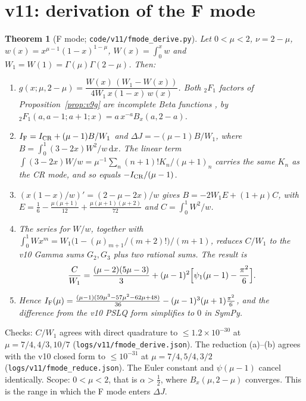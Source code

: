 \documentclass[11pt,a4paper]{article}
\newcommand{\loc}[1]{\nolinkurl{#1}}
\theoremstyle{plain}
\newtheorem{theorem}{Theorem}[section]
\theoremstyle{definition}
\theoremstyle{remark}
\numberwithin{equation}{section}
\begin{document}
\section{v11: derivation of the F mode}
\label{sec:v11IF}

\begin{theorem}[F mode; \loc{code/v11/fmode_derive.py}]
\label{thm:v11IF}
Let \(0<\mu<2\), \(\nu=2-\mu\), \(w(x)=x^{\mu-1}(1-x)^{1-\mu}\),
\(W(x)=\int_0^xw\) and \(W_1=W(1)=\Gamma(\mu)\Gamma(2-\mu)\). Then:
\begin{enumerate}[label=(\alph*)]
\item \(g(x;\mu,2-\mu)=\dfrac{W(x)\,(W_1-W(x))}{4W_1\,x(1-x)\,w(x)}\).
Both \({}_2F_1\) factors of Proposition~\ref{prop:v9g} are
incomplete Beta functions \cite{DLMFBeta}, by
\({}_2F_1(a,a-1;a+1;x)=a\,x^{-a}B_x(a,2-a)\).
\item \(I_{\rm F}=I_{\rm CR}+(\mu-1)B/W_1\) and
\(\Delta J=-(\mu-1)B/W_1\), where
\(B=\int_0^1(3-2x)W^2/w\,\mathrm dx\). The linear term
\(\int(3-2x)W/w=\mu^{-1}\sum_n(n+1)!K_n/(\mu+1)_n\) carries the same
\(K_n\) as the CR mode, and so equals \(-I_{\rm CR}/(\mu-1)\).
\item \((x(1-x)/w)'=(2-\mu-2x)/w\) gives
\(B=-2W_1E+(1+\mu)C\), with
\(E=\tfrac16-\tfrac{\mu(\mu+1)}{12}+\tfrac{\mu(\mu+1)(\mu+2)}{72}\)
and \(C=\int_0^1W^2/w\).
\item The series for \(W/w\), together with
\(\int_0^1Wx^m=W_1\bigl(1-(\mu)_{m+1}/(m+2)!\bigr)/(m+1)\), reduces
\(C/W_1\) to the v10 Gamma sums \(G_2,G_3\) plus two rational sums.
The result is
\[
\frac{C}{W_1}=\frac{(\mu-2)(5\mu-3)}3+(\mu-1)^2\Bigl[\psi_1(\mu-1)-\frac{\pi^2}6\Bigr].
\]
\item Hence
\(I_{\rm F}(\mu)=\tfrac{(\mu-1)(59\mu^3-57\mu^2-62\mu+48)}{36}-(\mu-1)^3(\mu+1)\tfrac{\pi^2}6\),
and the difference from the v10 PSLQ form simplifies to \(0\) in
SymPy.
\end{enumerate}
\end{theorem}
Checks: \(C/W_1\) agrees with direct quadrature to
\(\le1.2\times10^{-30}\) at \(\mu=7/4,4/3,10/7\)
(\loc{logs/v11/fmode_derive.json}). The reduction (a)--(b) agrees
with the v10 closed form to \(\le10^{-31}\) at \(\mu=7/4,5/4,3/2\)
(\loc{logs/v11/fmode_reduce.json}). The Euler constant and
\(\psi(\mu-1)\) cancel identically. Scope: \(0<\mu<2\), that is
\(\alpha>\tfrac12\), where \(B_x(\mu,2-\mu)\) converges. This is the
range in which the F mode enters \(\Delta J\).
\end{document}
